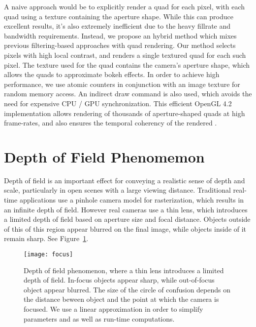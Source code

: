 A naive approach would be to explicitly render a quad for each pixel, with each quad using a texture containing the aperture shape. While this can produce excellent results, it's also extremely inefficient due to the heavy fillrate and bandwidth requirements. Instead, we propose an hybrid method which mixes previous filtering-based approaches with quad rendering. Our method selects pixels with high local contrast, and renders a single textured quad for each such pixel. The texture used for the quad contains the camera's aperture shape, which allows the quads to approximate bokeh effects. In order to achieve high performance, we use atomic counters in conjunction with an image texture for random memory access. An indirect draw command is also used, which avoids the need for expensive CPU / GPU synchronization. This efficient OpenGL 4.2 implementation allows rendering of thousands of aperture-shaped quads at high frame-rates, and also ensures the temporal coherency of the rendered \bokeh.

\section{Depth of Field Phenomemon}\label{Derousiers:DOFPhenomenon}
Depth of field is an important effect for conveying a realistic sense of depth and scale, particularly in open scenes with a large viewing distance. Traditional real-time applications use a pinhole camera model for rasterization, which results in an infinite depth of field. However real cameras use a thin lens, which introduces a limited depth of field based on aperture size and focal distance. Objects outside of this of this region appear blurred on the final image, while objects inside of it remain sharp. See Figure~\ref{DeRousiers:focus}.

	\begin{figure}[htb]\centering
	\texttt{[image: focus]}
	\caption{Depth of field phenomenon, where a thin lens introduces a limited depth of field. In-focus objects appear sharp, while out-of-focus object appear blurred. The size of the circle of confusion depends on the distance beween object and the point at which the camera is focused. We use a linear approximation in order to simplify parameters and as well as run-time computations. }
	\label{DeRousiers:focus}
	\end{figure}



